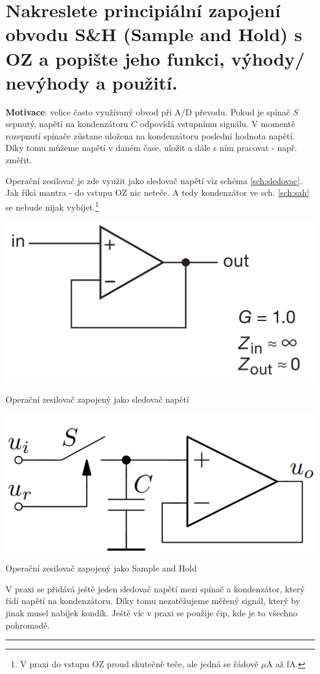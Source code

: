 \documentclass[a4paper,12pt]{article}   %
\newcommand{\tmu}{$\mu$}
\begin{document}
\section{Nakreslete principiální zapojení obvodu S\&H (Sample and Hold) s OZ a popište jeho funkci, výhody/ nevýhody a použití.}
\textbf{Motivace}: velice často využívaný obvod při A/D převodu. Pokud je spínač $S$ sepnutý, napětí na kondenzátoru $C$ odpovídá vstupnímu signálu. V momentě rozepnutí spínače zůstane uložena na kondenzátoru poslední hodnota napětí. Díky tomu můžeme  napětí v daném čase, uložit a dále s ním pracovat - např. změřit.

Operační zesilovač je zde využit jako sledovač napětí viz schéma \ref{sch:sledovac}. Jak říká mantra - do vstupu OZ nic neteče. A tedy kondenzátor ve sch. \ref{sch:sah} se nebude nijak vybíjet.\footnote{V praxi do vstupu OZ proud skutečně teče, ale jedná se řádově \tmu A až fA.}

\begin{schema}
    \centering
    \includegraphics[width=.5\textwidth]{voltage-follower.PNG}
    \caption{Operační zesilovač zapojený jako sledovač napětí}
    \label{sch:sledovac}
\end{schema}

\begin{schema}
    \centering
    \includegraphics[width=.5\textwidth]{sample_hold.PNG}
    \caption{Operační zesilovač zapojený jako Sample and Hold}
    \label{sch:sah}
\end{schema}

V praxi se přidává ještě jeden sledovač napětí mezi spínač a kondenzátor, který řídí napětí na kondenzátoru. Díky tomu nezatěžujeme měřený signál, který by jinak musel nabíjek kondík. Ještě víc v praxi se použije čip, kde je to všechno pohromadě.
\\
\hrule%
\end{document}
